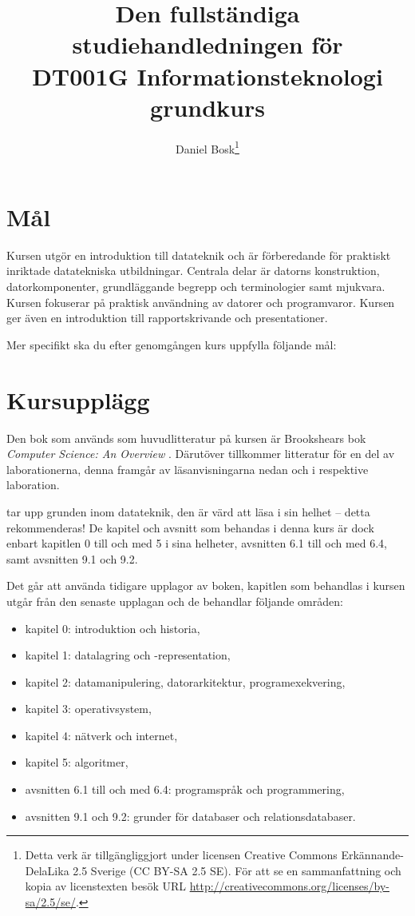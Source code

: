 \documentclass[a4paper,logo]{miunart}
\title{Den fullständiga studiehandledningen för\\
  DT001G Informationsteknologi grundkurs}
\author{
  Daniel Bosk\footnote{%
    Detta verk är tillgängliggjort under licensen Creative Commons 
    Erkännande-DelaLika 2.5 Sverige (CC BY-SA 2.5 SE).
    För att se en sammanfattning och kopia av licenstexten besök URL 
    \url{http://creativecommons.org/licenses/by-sa/2.5/se/}.
  }
}
\date{\svnId}
\begin{document}
\maketitle
\tableofcontents


\section{Mål}
\label{sec:aim}
Kursen utgör en introduktion till datateknik och är förberedande för praktiskt 
inriktade datatekniska utbildningar.
Centrala delar är datorns konstruktion, datorkomponenter, grundläggande begrepp 
och terminologier samt mjukvara.
Kursen fokuserar på praktisk användning av datorer och programvaror.
Kursen ger även en introduktion till rapportskrivande och presentationer.

Mer specifikt ska du efter genomgången kurs uppfylla följande mål:
\begin{itemize}
  
  
  
  
  
\end{itemize}


\section{Kursupplägg}
\label{sec:outline}
Den bok som används som huvudlitteratur på kursen är Brookshears bok 
\emph{Computer Science: An Overview} \cite{Brookshear2012csa}.
Därutöver tillkommer litteratur för en del av laborationerna, denna framgår av 
läsanvisningarna nedan och i respektive laboration.

\citet{Brookshear2012csa} tar upp grunden inom datateknik, den är värd att läsa 
i sin helhet -- detta rekommenderas!
De kapitel och avsnitt som behandas i denna kurs är dock enbart kapitlen 0 till 
och med 5 i sina helheter, avsnitten 6.1 till och med 6.4, samt avsnitten 9.1 
och 9.2.

Det går att använda tidigare upplagor av boken, kapitlen som behandlas i kursen 
utgår från den senaste upplagan \citep{Brookshear2012csa} och de behandlar 
följande områden:
\begin{itemize}
	\item kapitel 0: introduktion och historia,
	\item kapitel 1: datalagring och -representation,
	\item kapitel 2: datamanipulering, datorarkitektur, programexekvering,
	\item kapitel 3: operativsystem,
	\item kapitel 4: nätverk och internet,
	\item kapitel 5: algoritmer,
	\item avsnitten 6.1 till och med 6.4: programspråk och programmering,
	\item avsnitten 9.1 och 9.2: grunder för databaser och relationsdatabaser.
\end{itemize}
\end{document}
